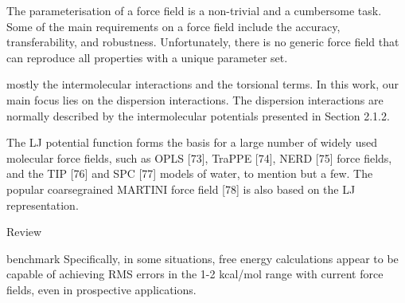 The parameterisation of a force field is a non-trivial and a cumbersome task. Some of
the main requirements on a force field include the accuracy, transferability, and robustness. Unfortunately, there is no generic force field that can reproduce all properties with a
unique parameter set.



mostly the intermolecular interactions and the torsional terms. In this work, our main focus lies on the
dispersion interactions. The dispersion interactions are normally described by the intermolecular potentials presented in Section 2.1.2.

The LJ potential function forms the basis for a large number of widely
used molecular force fields, such as OPLS [73], TraPPE [74], NERD [75] force fields, and
the TIP [76] and SPC [77] models of water, to mention but a few. The popular coarsegrained MARTINI force field [78] is also based on the LJ representation.


Review




benchmark
Specifically, in some
situations, free energy calculations appear to be capable
of achieving RMS errors in the 1-2 kcal/mol range with
current force fields, even in prospective applications.

